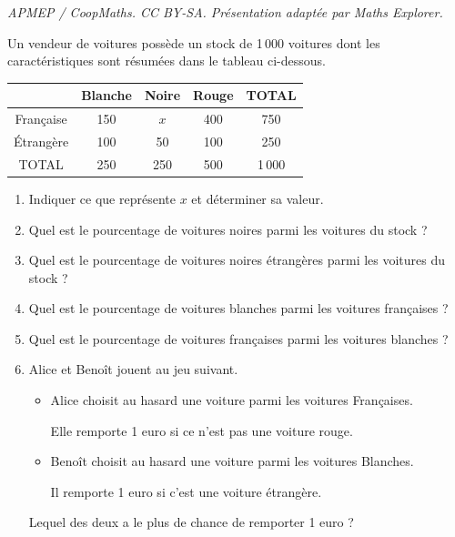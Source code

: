 \documentclass[10pt]{article}
\begin{document}
\noindent\textit{APMEP / CoopMaths. CC BY-SA. Présentation adaptée par Maths Explorer.}\par\medskip
Un vendeur de voitures possède un stock de 1\,000 voitures dont les caractéristiques sont résumées dans le tableau ci-dessous.

\begin{center}
\begin{tabular}{|c|c|c|c|c|}
\hline
 & Blanche & Noire & Rouge & TOTAL \\
\hline
Française & 150 & $x$ & 400 & 750 \\
\hline
Étrangère & 100 & 50 & 100 & 250 \\
\hline
TOTAL & 250 & 250 & 500 & 1\,000 \\
\hline
\end{tabular}
\end{center}

\begin{enumerate}
\item Indiquer ce que représente $x$ et déterminer sa valeur.
\item Quel est le pourcentage de voitures noires parmi les voitures du stock ?
\item Quel est le pourcentage de voitures noires étrangères parmi les voitures du stock ?
\item Quel est le pourcentage de voitures blanches parmi les voitures françaises ?
\item Quel est le pourcentage de voitures françaises parmi les voitures blanches ?
\item Alice et Benoît jouent au jeu suivant.
\begin{itemize}
\item Alice choisit au hasard une voiture parmi les voitures Françaises.

Elle remporte 1 euro si ce n'est pas une voiture rouge.
\item Benoît choisit au hasard une voiture parmi les voitures Blanches.

Il remporte 1 euro si c'est une voiture étrangère.
\end{itemize}
Lequel des deux a le plus de chance de remporter 1 euro ?
\end{enumerate}


\bigskip
\end{document}
